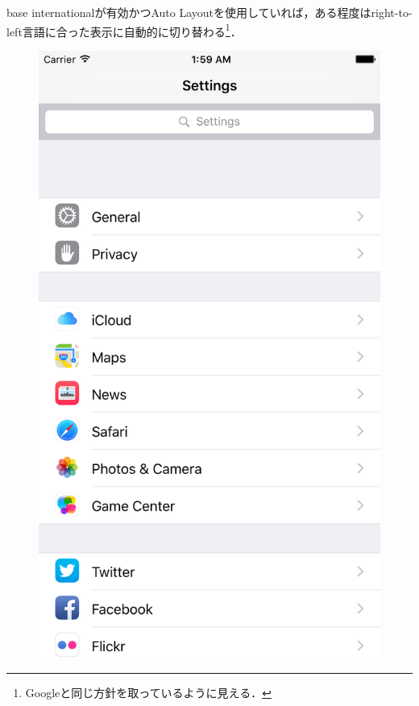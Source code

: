 base internationalが有効かつAuto Layoutを使用していれば，ある程度はright-to-left言語に合った表示に自動的に切り替わる\footnote{Googleと同じ方針\cite{material.io/design/usability/bidirectionality.html}を取っているように見える．}\cite{developer.apple.com:library/archive/documentation/MacOSX/Conceptual/BPInternational/SupportingRight-To-LeftLanguages/SupportingRight-To-LeftLanguages.html}．

\begin{figure}[htbp]
    \begin{minipage}{0.5\hsize}
        \begin{center}
            \includegraphics[width=\linewidth]{images/ios_preferences_regular.png}

\end{center}
\end{minipage}
\end{figure}
